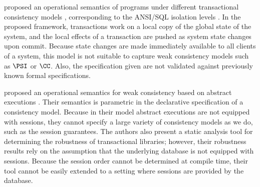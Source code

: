 \citeauthor{alonetogether} proposed an operational semantics of programs 
under different transactional consistency models \cite{alonetogether}, 
corresponding to the ANSI/SQL isolation levels \cite{si}.
In the proposed framework, transactions work on a local copy of the global state 
of the system, and the local effects of a transaction are pushed as 
system state changes upon commit. Because state changes 
are made immediately available to all clients of a system, this model 
is not suitable to capture weak consistency models such as \(\PSI\) or \(\CC\). 
Also, the specification given are not validated against previously known 
formal specifications.

\citeauthor{sureshConcur} proposed an operational semantics for weak consistency 
based on abstract executions \cite{sureshConcur}. Their semantics 
is parametric in the declarative specification of a consistency model. Because 
in their model abstract executions are not equipped with sessions, they cannot 
specify a large variety of consistency models as we do, such as the session guarantees. 
The authors also present a static analysis tool for determining the robustness of transactional 
libraries; however, their robustness results rely on the assumption that the underlying database 
is not equipped with sessions. Because the session order cannot be determined at compile time, 
their tool cannot be easily extended to a setting where sessions are provided by the database. 


